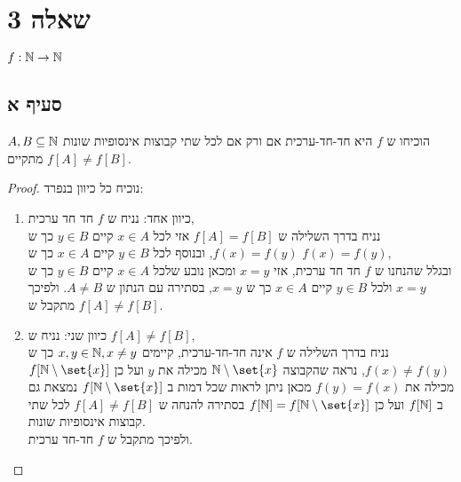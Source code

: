 \documentclass{article}
\DeclarePairedDelimiter\set\{\}
\begin{document}
\pagebreak
\section*{שאלה 3}
$f: \mathbb{N} \to \mathbb{N}$
\subsection*{סעיף א}
הוכיחו ש $f$ היא חד-חד-ערכית אם ורק אם לכל שתי קבוצות אינסופיות שונות $A,B \subseteq \mathbb{N}$ מתקיים $f[A] \neq f[B]$.
\begin{proof}
	נוכיח כל כיוון בנפרד:
	\begin{enumerate}
		\item כיוון אחד: נניח ש $f$ חד חד ערכית, \\
		נניח בדרך השלילה ש $f[A] = f[B]$ אזי לכל $x \in A$ קיים $y \in B$ כך ש  $f(x) = f(y)$,
		ובנוסף לכל $y \in B$ קיים $x \in A$ כך ש $f(x) = f(y)$, \\
		ובגלל שהנחנו ש $f$ חד חד ערכית, אזי $x = y$
		ומכאן נובע שלכל $x \in A$ קיים $y \in B$ כך ש $x=y$
		ולכל $y \in B$ קיים $x \in A$ כך ש $x=y$, בסתירה עם הנתון ש $A \neq B$.
		ולפיכך מתקבל ש $f[A] \neq f[B]$.

		\item כיוון שני: נניח ש $f[A] \neq f[B]$,\\
		נניח בדרך השלילה ש $f$ אינה חד-חד-ערכית, קיימים $x, y \in \mathbb{N}, x \neq y$ כך ש $f(x) \neq f(y)$,
		נראה שהקבוצה $\NN\sub \set{x}$ מכילה את $y$ ועל כן $f[\NN\sub\set{x}]$ מכילה את $f(y)=f(x)$
		מכאן ניתן לראות שכל דמות ב $f[\NN\sub\set{x}]$ נמצאת גם ב $f[\mathbb{N}]$ ועל כן $f[\NN] = f[\NN\sub\set{x}]$
		בסתירה להנחה ש $f[A] \neq f[B]$ לכל שתי קבוצות אינסופיות שונות. \\
		ולפיכך מתקבל ש $f$ חד-חד ערכית.
	\end{enumerate}
\end{proof}
\end{document}
